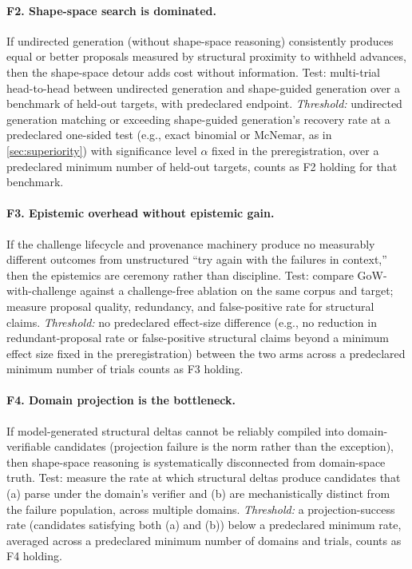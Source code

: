 \documentclass[11pt]{article}
\theoremstyle{gowthm}
\theoremstyle{gowplain}
\begin{document}
\paragraph{F2. Shape-space search is dominated.}
If undirected generation (without shape-space reasoning) consistently produces
equal or better proposals measured by structural proximity to withheld advances,
then the shape-space detour adds cost without information. Test: multi-trial
head-to-head between undirected generation and shape-guided generation over a
benchmark of held-out targets, with predeclared endpoint. \emph{Threshold:}
undirected generation matching or exceeding shape-guided generation's recovery
rate at a predeclared one-sided test (e.g., exact binomial or McNemar, as in
\cref{sec:superiority}) with significance level $\alpha$ fixed in the
preregistration, over a predeclared minimum number of held-out targets, counts
as F2 holding for that benchmark.

\paragraph{F3. Epistemic overhead without epistemic gain.}
If the challenge lifecycle and provenance machinery produce no measurably
different outcomes from unstructured ``try again with the failures in context,''
then the epistemics are ceremony rather than discipline. Test: compare
GoW-with-challenge against a challenge-free ablation on the same corpus and
target; measure proposal quality, redundancy, and false-positive rate for
structural claims. \emph{Threshold:} no predeclared effect-size difference
(e.g., no reduction in redundant-proposal rate or false-positive structural
claims beyond a minimum effect size fixed in the preregistration) between the
two arms across a predeclared minimum number of trials counts as F3 holding.

\paragraph{F4. Domain projection is the bottleneck.}
If model-generated structural deltas cannot be reliably compiled into
domain-verifiable candidates (projection failure is the norm rather than the
exception), then shape-space reasoning is systematically disconnected from
domain-space truth. Test: measure the rate at which structural deltas produce
candidates that (a) parse under the domain's verifier and (b) are
mechanistically distinct from the failure population, across multiple domains.
\emph{Threshold:} a projection-success rate (candidates satisfying both (a)
and (b)) below a predeclared minimum rate, averaged across a predeclared
minimum number of domains and trials, counts as F4 holding.
\end{document}
